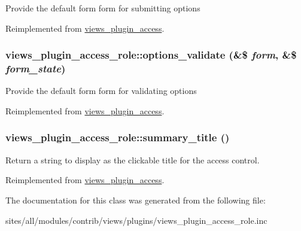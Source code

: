 Provide the default form form for submitting options 

Reimplemented from \hyperlink{classviews__plugin__access_d0610dfaa0e225c5d2cd85c7a13287fd}{views\_\-plugin\_\-access}.\hypertarget{classviews__plugin__access__role_82fda91cd55acbbcac1759448c8fc471}{
\subsubsection[{options\_\-validate}]{\setlength{\rightskip}{0pt plus 5cm}views\_\-plugin\_\-access\_\-role::options\_\-validate (\&\$ {\em form}, \/  \&\$ {\em form\_\-state})}}
\label{classviews__plugin__access__role_82fda91cd55acbbcac1759448c8fc471}


Provide the default form form for validating options 

Reimplemented from \hyperlink{classviews__plugin__access_1ac0bea409be6ef8d7eb4bfafcf760c6}{views\_\-plugin\_\-access}.\hypertarget{classviews__plugin__access__role_25dbbc0f06093f0e4ee13182ea0d277f}{
\subsubsection[{summary\_\-title}]{\setlength{\rightskip}{0pt plus 5cm}views\_\-plugin\_\-access\_\-role::summary\_\-title ()}}
\label{classviews__plugin__access__role_25dbbc0f06093f0e4ee13182ea0d277f}


Return a string to display as the clickable title for the access control. 

Reimplemented from \hyperlink{classviews__plugin__access_de500a95e599deffa417f8cbdd67bbf4}{views\_\-plugin\_\-access}.

The documentation for this class was generated from the following file:\begin{CompactItemize}
\item 
sites/all/modules/contrib/views/plugins/views\_\-plugin\_\-access\_\-role.inc\end{CompactItemize}
